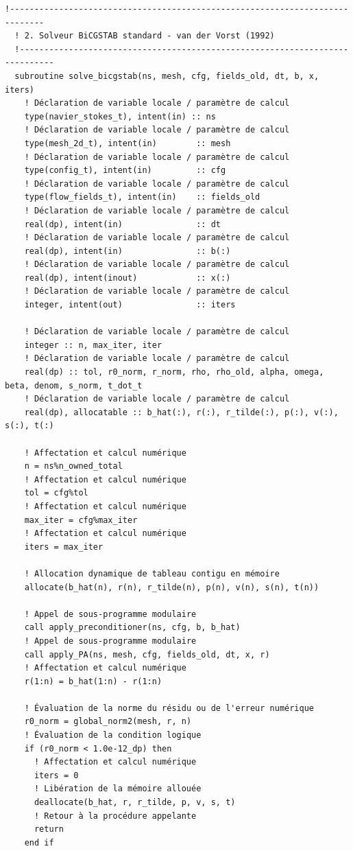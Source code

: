 \documentclass[10pt,a4paper,oneside]{book}
\begin{document}
\begin{lstlisting}[language={[95]Fortran}]
  !-----------------------------------------------------------------------------
  ! 2. Solveur BiCGSTAB standard - van der Vorst (1992)
  !-----------------------------------------------------------------------------
  subroutine solve_bicgstab(ns, mesh, cfg, fields_old, dt, b, x, iters)
    ! Déclaration de variable locale / paramètre de calcul
    type(navier_stokes_t), intent(in) :: ns
    ! Déclaration de variable locale / paramètre de calcul
    type(mesh_2d_t), intent(in)        :: mesh
    ! Déclaration de variable locale / paramètre de calcul
    type(config_t), intent(in)         :: cfg
    ! Déclaration de variable locale / paramètre de calcul
    type(flow_fields_t), intent(in)    :: fields_old
    ! Déclaration de variable locale / paramètre de calcul
    real(dp), intent(in)               :: dt
    ! Déclaration de variable locale / paramètre de calcul
    real(dp), intent(in)               :: b(:)
    ! Déclaration de variable locale / paramètre de calcul
    real(dp), intent(inout)            :: x(:)
    ! Déclaration de variable locale / paramètre de calcul
    integer, intent(out)               :: iters

    ! Déclaration de variable locale / paramètre de calcul
    integer :: n, max_iter, iter
    ! Déclaration de variable locale / paramètre de calcul
    real(dp) :: tol, r0_norm, r_norm, rho, rho_old, alpha, omega, beta, denom, s_norm, t_dot_t
    ! Déclaration de variable locale / paramètre de calcul
    real(dp), allocatable :: b_hat(:), r(:), r_tilde(:), p(:), v(:), s(:), t(:)

    ! Affectation et calcul numérique
    n = ns%n_owned_total
    ! Affectation et calcul numérique
    tol = cfg%tol
    ! Affectation et calcul numérique
    max_iter = cfg%max_iter
    ! Affectation et calcul numérique
    iters = max_iter

    ! Allocation dynamique de tableau contigu en mémoire
    allocate(b_hat(n), r(n), r_tilde(n), p(n), v(n), s(n), t(n))

    ! Appel de sous-programme modulaire
    call apply_preconditioner(ns, cfg, b, b_hat)
    ! Appel de sous-programme modulaire
    call apply_PA(ns, mesh, cfg, fields_old, dt, x, r)
    ! Affectation et calcul numérique
    r(1:n) = b_hat(1:n) - r(1:n)

    ! Évaluation de la norme du résidu ou de l'erreur numérique
    r0_norm = global_norm2(mesh, r, n)
    ! Évaluation de la condition logique
    if (r0_norm < 1.0e-12_dp) then
      ! Affectation et calcul numérique
      iters = 0
      ! Libération de la mémoire allouée
      deallocate(b_hat, r, r_tilde, p, v, s, t)
      ! Retour à la procédure appelante
      return
    end if


\end{lstlisting}
\end{document}
